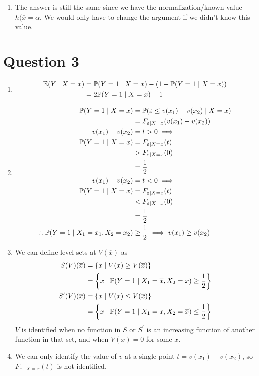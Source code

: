 \begin{enumerate}
  \item The answer is still the same since we have the normalization/known value $h(\overline{x} = \alpha$. We would only have to change the argument if we didn't know this value.
\end{enumerate}
\section{Question 3}
\begin{enumerate}
\item
  \begin{align*}
    \mathbb{E}(Y \mid X = x) &= \mathbb{P} (Y = 1 \mid X = x) - (1 - \mathbb{P}(Y = 1 \mid X = x))\\
    &= 2 \mathbb{P}(Y = 1 \mid X = x) - 1
  \end{align*}
\item
  \begin{align*}
    \mathbb{P}(Y = 1 \mid X = x) &= \mathbb{P}(\varepsilon \le v(x_1) - v(x_2) \mid X = x)\\
                         &= F_{\varepsilon \mid X = x} (v(x_1) - v(x_2))\\
    v(x_1) - v(x_2) &= t > 0 \implies \\
    \mathbb{P}(Y = 1 \mid X = x) &= F_{\varepsilon \mid X = x}(t)\\
                         &> F_{\varepsilon \mid X = x}(0)\\
                         &= \frac{1}{2}\\
    v(x_1) - v(x_2) & =t < 0 \implies \\
    \mathbb{P}(Y = 1 \mid X =x) &= F_{\varepsilon \mid X = x} (t)\\
                         &< F_{\varepsilon \mid X = x} (0)\\
                         &= \frac{1}{2}\\
    \therefore \mathbb{P}(Y = 1 \mid X_1 = x_1, X_2 = x_2) &\ge \frac{1}{2} \iff v(x_1) \ge v(x_2)
  \end{align*}
\item
  We can define level sets at $V(\overline{x})$ as
  \begin{align*}
    S(V)(\overline{x}) &= \{x \mid V(x) \ge V(\overline{x})\}\\
                       &= \left\{x \mid \mathbb{P}(Y = 1 \mid X_1 = \overline{x}, X_2 = x) \ge \frac{1}{2}\right\}\\
    S^\prime(V) (\overline{x}) &= \{x \mid V(x) \le V(\overline{x})\}\\
    &= \left\{x \mid \mathbb{P} (Y = 1 \mid X_1 = x, X_2 = \overline{x}) \le \frac{1}{2} \right\}
  \end{align*}
  $V$ is identified when no function in $S$ or $S^\prime$ is an increasing function of another function in that set, and when $V(\overline{x}) = 0$ for some $\overline{x}$.

  \item We can only identify the value of $v$ at a single point $t = v(x_1) - v(x_2)$, so $F_{\varepsilon \mid X = x} (t)$ is not identified.
\end{enumerate}

